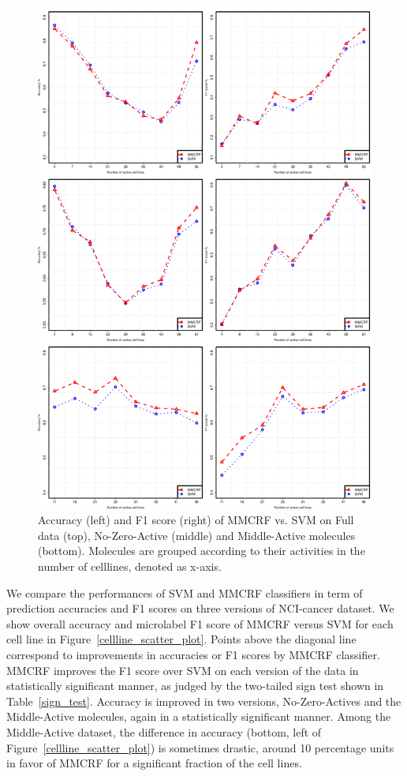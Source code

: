\documentclass[english]{tktltiki}
\begin{document}
\begin{figure}[p]
\includegraphics[width=1\columnwidth]{./plots/acc-f1-combined-cellline.pdf}
\caption[performance of MMCRF against SVM in active groups.]{Accuracy (left) and F1 score (right) of MMCRF vs. SVM on Full data (top), No-Zero-Active (middle) and Middle-Active molecules (bottom). Molecules are grouped according to their activities in the number of celllines, denoted as x-axis.}
\label{group_scatter_plot}
\end{figure}

We compare the performances of SVM and MMCRF classifiers in term of prediction accuracies and F1 scores on three versions of NCI-cancer dataset. We show overall accuracy and microlabel F1 score of MMCRF versus SVM for each cell line in Figure~\ref{cellline_scatter_plot}. Points above the diagonal line correspond to improvements in accuracies or F1 scores by MMCRF classifier. MMCRF improves the F1 score over SVM on each version of the data in statistically significant manner, as judged by the two-tailed sign test shown in Table~\ref{sign_test}. Accuracy is improved in two versions, No-Zero-Actives and the Middle-Active molecules, again in a statistically significant manner. Among the Middle-Active dataset, the difference in accuracy (bottom, left of Figure~\ref{cellline_scatter_plot}) is sometimes drastic, around 10 percentage units in favor of MMCRF for a significant fraction of the cell lines.
\end{document}

